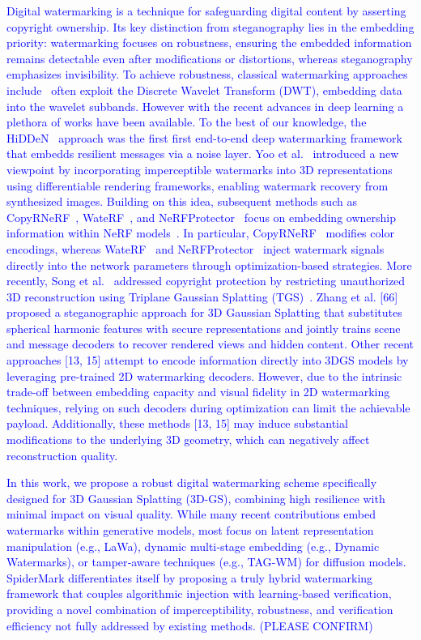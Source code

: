 \textcolor{blue}{
Digital watermarking is a technique for safeguarding digital content by asserting copyright ownership. Its key distinction from steganography lies in the embedding priority: watermarking focuses on robustness, ensuring the embedded information remains detectable even after modifications or distortions, whereas steganography emphasizes invisibility.
To achieve robustness, classical watermarking approaches include~\cite{barni2001improved, raval2003discrete, shensa2002discrete,tao2004robust} often exploit the Discrete Wavelet Transform (DWT), embedding data into the wavelet subbands. However with the recent advances in deep learning a plethora of works have been available.
To the best of our knowledge, the HiDDeN~\cite{zhu2018hidden} approach was the first first end-to-end deep watermarking framework that embedds resilient messages via a noise layer. Yoo et al.~\cite{yoo2022deep} introduced a new viewpoint by incorporating imperceptible watermarks into 3D representations using differentiable rendering frameworks, enabling watermark recovery from synthesized images. Building on this idea, subsequent methods such as CopyRNeRF~\cite{luo2023copyrnerf}, WateRF~\cite{jang2024waterf}, and NeRFProtector~\cite{song2024protecting} focus on embedding ownership information within NeRF models~\cite{mildenhall2021nerf}. 
In particular, CopyRNeRF~\cite{luo2023copyrnerf} modifies color encodings, whereas WateRF~\cite{jang2024waterf} and NeRFProtector~\cite{song2024protecting} inject watermark signals directly into the network parameters through optimization-based strategies. More recently, Song et al.~\cite{song2024geometry} addressed copyright protection by restricting unauthorized 3D reconstruction using Triplane Gaussian Splatting (TGS)~\cite{zou2024triplane}. Zhang et al. [66] proposed a steganographic approach for 3D Gaussian Splatting that substitutes spherical harmonic features with secure representations and jointly trains scene and message decoders to recover rendered views and hidden content. Other recent approaches [13, 15] attempt to encode information directly into 3DGS models by leveraging pre-trained 2D watermarking decoders. However, due to the intrinsic trade-off between embedding capacity and visual fidelity in 2D watermarking techniques, relying on such decoders during optimization can limit the achievable payload. Additionally, these methods [13, 15] may induce substantial modifications to the underlying 3D geometry, which can negatively affect reconstruction quality.
}


\textcolor{blue}{
In this work, we propose a robust digital watermarking scheme specifically designed for 3D Gaussian Splatting (3D-GS), combining high resilience with minimal impact on visual quality. While many recent contributions embed watermarks within generative models, most focus on latent representation manipulation (e.g., LaWa), dynamic multi‑stage embedding (e.g., Dynamic Watermarks), or tamper‑aware techniques (e.g., TAG‑WM) for diffusion models. SpiderMark differentiates itself by proposing a truly hybrid watermarking framework that couples algorithmic injection with learning‑based verification, providing a novel combination of imperceptibility, robustness, and verification efficiency not fully addressed by existing methods. (PLEASE CONFIRM)}

